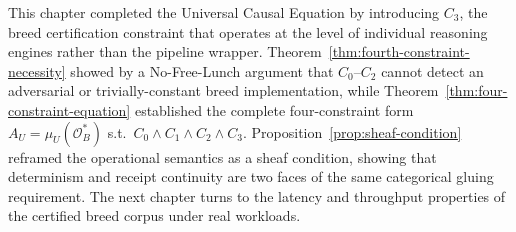 This chapter completed the Universal Causal Equation by introducing $C_3$, the breed
certification constraint that operates at the level of individual reasoning engines
rather than the pipeline wrapper. Theorem~\ref{thm:fourth-constraint-necessity}
showed by a No-Free-Lunch argument that $C_0$--$C_2$ cannot detect an adversarial or
trivially-constant breed implementation, while Theorem~\ref{thm:four-constraint-equation}
established the complete four-constraint form $A_U = \mu_U(\mathcal{O}^*_B)$ s.t.\
$C_0 \wedge C_1 \wedge C_2 \wedge C_3$. Proposition~\ref{prop:sheaf-condition}
reframed the operational semantics as a sheaf condition, showing that determinism and
receipt continuity are two faces of the same categorical gluing requirement. The next
chapter turns to the latency and throughput properties of the certified breed corpus
under real workloads.

